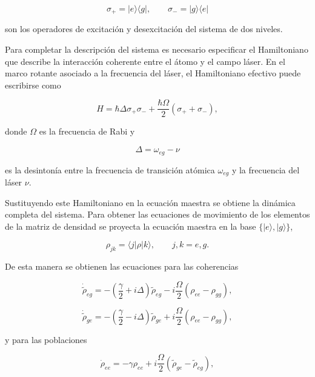 \documentclass[11pt]{report}
\begin{document}
\begin{equation}
\sigma_+ = |e\rangle\langle g|,
\qquad
\sigma_- = |g\rangle\langle e|
\end{equation}

son los operadores de excitación y desexcitación del sistema de dos niveles.

Para completar la descripción del sistema es necesario especificar el Hamiltoniano que describe la interacción coherente entre el átomo y el campo láser. En el marco rotante asociado a la frecuencia del láser, el Hamiltoniano efectivo puede escribirse como

\begin{equation}
H =
\hbar \Delta \sigma_+\sigma_-
+
\frac{\hbar\Omega}{2}
(\sigma_+ + \sigma_-),
\end{equation}

donde $\Omega$ es la frecuencia de Rabi y

\begin{equation}
\Delta = \omega_{eg} - \nu
\end{equation}

es la desintonía entre la frecuencia de transición atómica $\omega_{eg}$ y la frecuencia del láser $\nu$.

Sustituyendo este Hamiltoniano en la ecuación maestra se obtiene la dinámica completa del sistema. Para obtener las ecuaciones de movimiento de los elementos de la matriz de densidad se proyecta la ecuación maestra en la base $\{|e\rangle,|g\rangle\}$,

\begin{equation}
\rho_{jk} = \langle j|\rho|k\rangle ,
\qquad j,k = e,g.
\end{equation}

De esta manera se obtienen las ecuaciones para las coherencias

\begin{equation}
\dot{\tilde{\rho}}_{eg}
=
-\left(
\frac{\gamma}{2}+i\Delta
\right)
\tilde{\rho}_{eg}
-
i\frac{\Omega}{2}
(\rho_{ee}-\rho_{gg}),
\end{equation}

\begin{equation}
\dot{\tilde{\rho}}_{ge}
=
-\left(
\frac{\gamma}{2}-i\Delta
\right)
\tilde{\rho}_{ge}
+
i\frac{\Omega}{2}
(\rho_{ee}-\rho_{gg}),
\end{equation}

y para las poblaciones

\begin{equation}
\dot{\rho}_{ee}
=
-\gamma \rho_{ee}
+
i\frac{\Omega}{2}
(\tilde{\rho}_{ge}-\tilde{\rho}_{eg}),
\end{equation}
\end{document}
